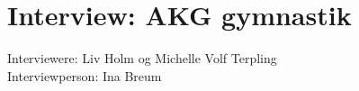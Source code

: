 \chapter{Interview: AKG gymnastik}\label{ch:appDlabel}
Interviewere: Liv Holm og Michelle Volf Terpling\\
Interviewperson: Ina Breum\\